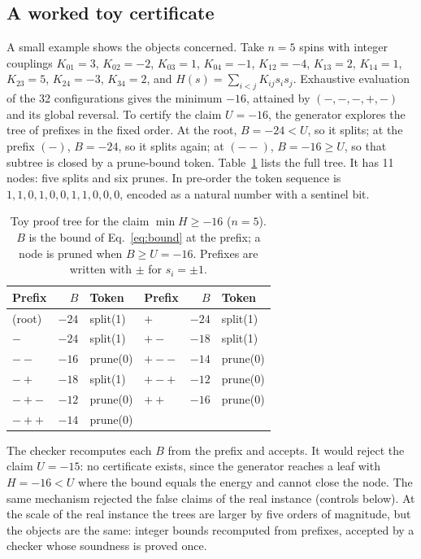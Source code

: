 \documentclass[11pt,a4paper]{article}
\theoremstyle{plain}
\theoremstyle{definition}
\theoremstyle{remark}
\begin{document}
\subsection{A worked toy certificate}\label{sec:toy}
A small example shows the objects concerned. Take $n=5$ spins with integer couplings $K_{01}=3$, $K_{02}=-2$, $K_{03}=1$, $K_{04}=-1$, $K_{12}=-4$, $K_{13}=2$, $K_{14}=1$, $K_{23}=5$, $K_{24}=-3$, $K_{34}=2$, and $H(s)=\sum_{i<j}K_{ij}s_is_j$. Exhaustive evaluation of the 32 configurations gives the minimum $-16$, attained by $(-,-,-,+,-)$ and its global reversal. To certify the claim $U=-16$, the generator explores the tree of prefixes in the fixed order. At the root, $B=-24<U$, so it splits; at the prefix $(-)$, $B=-24$, so it splits again; at $(--)$, $B=-16\ge U$, so that subtree is closed by a prune-bound token. Table~\ref{tab:toy} lists the full tree. It has 11 nodes: five splits and six prunes. In pre-order the token sequence is $1,1,0,1,0,0,1,1,0,0,0$, encoded as a natural number with a sentinel bit.

\begin{table}[t]
\centering\small
\caption{Toy proof tree for the claim $\min H\ge-16$ ($n=5$). $B$ is the bound of Eq.~\eqref{eq:bound} at the prefix; a node is pruned when $B\ge U=-16$. Prefixes are written with $\pm$ for $s_i=\pm1$.}
\label{tab:toy}
\begin{tabular}{@{}lrl@{\qquad}lrl@{}}
\toprule
Prefix & $B$ & Token & Prefix & $B$ & Token\\
\midrule
(root) & $-24$ & split(1) & $+$ & $-24$ & split(1)\\
$-$ & $-24$ & split(1) & $+-$ & $-18$ & split(1)\\
$--$ & $-16$ & prune(0) & $+--$ & $-14$ & prune(0)\\
$-+$ & $-18$ & split(1) & $+-+$ & $-12$ & prune(0)\\
$-+-$ & $-12$ & prune(0) & $++$ & $-16$ & prune(0)\\
$-++$ & $-14$ & prune(0) & & & \\
\bottomrule
\end{tabular}
\end{table}

The checker recomputes each $B$ from the prefix and accepts. It would reject the claim $U=-15$: no certificate exists, since the generator reaches a leaf with $H=-16<U$ where the bound equals the energy and cannot close the node. The same mechanism rejected the false claims of the real instance (controls below). At the scale of the real instance the trees are larger by five orders of magnitude, but the objects are the same: integer bounds recomputed from prefixes, accepted by a checker whose soundness is proved once.
\end{document}
